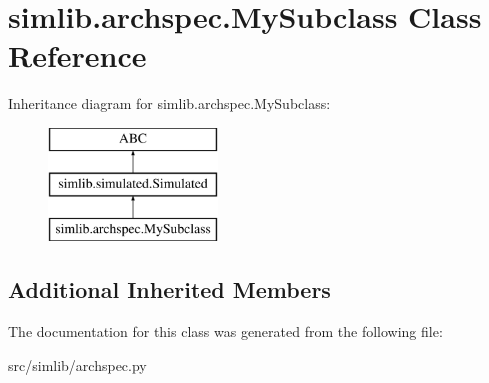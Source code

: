 \hypertarget{classsimlib_1_1archspec_1_1_my_subclass}{}\section{simlib.\+archspec.\+My\+Subclass Class Reference}
\label{classsimlib_1_1archspec_1_1_my_subclass}
Inheritance diagram for simlib.\+archspec.\+My\+Subclass\+:\begin{figure}[H]
\begin{center}
\leavevmode
\includegraphics[height=3.000000cm]{classsimlib_1_1archspec_1_1_my_subclass}
\end{center}
\end{figure}
\subsection*{Additional Inherited Members}


The documentation for this class was generated from the following file\+:\begin{DoxyCompactItemize}
\item 
src/simlib/archspec.\+py\end{DoxyCompactItemize}
